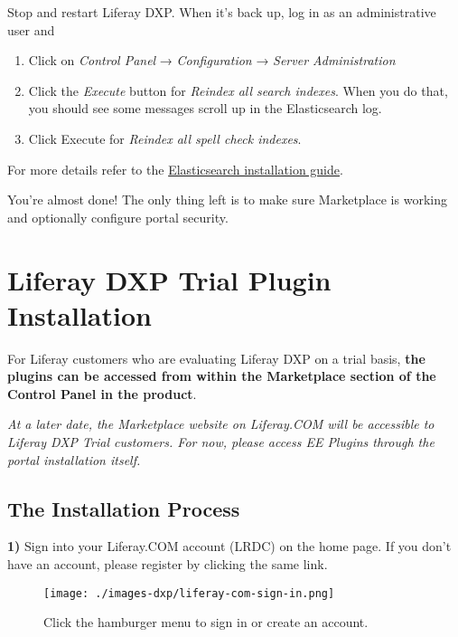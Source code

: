 Stop and restart Liferay DXP. When it's back up, log in as an
administrative user and

\begin{enumerate}
\def\labelenumi{\arabic{enumi}.}
\item
  Click on \emph{Control Panel} → \emph{Configuration} → \emph{Server
  Administration}
\item
  Click the \emph{Execute} button for \emph{Reindex all search indexes}.
  When you do that, you should see some messages scroll up in the
  Elasticsearch log.
\item
  Click Execute for \emph{Reindex all spell check indexes}.
\end{enumerate}

For more details refer to the
\href{https://www.elastic.co/guide/en/elasticsearch/reference/2.4/_installation.html}{Elasticsearch
installation guide}.

You're almost done! The only thing left is to make sure Marketplace is
working and optionally configure portal security.

\section{Liferay DXP Trial Plugin
Installation}\label{liferay-dxp-trial-plugin-installation}

For Liferay customers who are evaluating Liferay DXP on a trial basis,
\textbf{the plugins can be accessed from within the Marketplace section
of the Control Panel in the product}.

\emph{At a later date, the Marketplace website on Liferay.COM will be
accessible to Liferay DXP Trial customers. For now, please access EE
Plugins through the portal installation itself.}

\subsection{The Installation Process}\label{the-installation-process}

\textbf{1)} Sign into your Liferay.COM account (LRDC) on the home page.
If you don't have an account, please register by clicking the same link.

\begin{figure}
\centering
\texttt{[image: ./images-dxp/liferay-com-sign-in.png]}
\caption{Click the hamburger menu to sign in or create an account.}
\end{figure}

